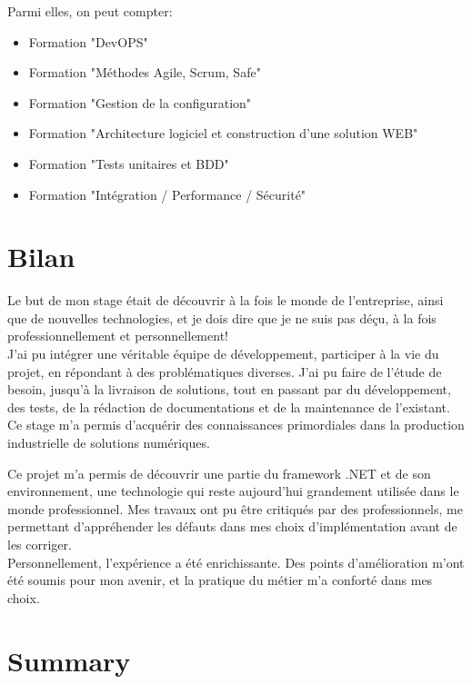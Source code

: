 \documentclass{rapport}
\begin{document}
Parmi elles, on peut compter:
\begin{itemize}
    \item Formation "DevOPS"
    \item Formation "Méthodes Agile, Scrum, Safe"
    \item Formation "Gestion de la configuration"
    \item Formation "Architecture logiciel et construction d’une solution WEB"
    \item Formation "Tests unitaires et BDD"
    \item Formation "Intégration / Performance / Sécurité"
\end{itemize}


\newpage
\section{Bilan}

Le but de mon stage était de découvrir à la fois le monde de l'entreprise, ainsi que de nouvelles technologies, et je dois dire que je ne suis pas déçu, à la fois professionnellement et personnellement!\\

J'ai pu intégrer une véritable équipe de développement, participer à la vie du projet, en répondant à des problématiques diverses. J'ai pu faire de l'étude de besoin, jusqu'à la livraison de solutions, tout en passant par du développement, des tests, de la rédaction de documentations et de la maintenance de l'existant. Ce stage m'a permis d'acquérir des connaissances primordiales dans la production industrielle de solutions numériques.

Ce projet m'a permis de découvrir une partie du framework .NET et de son environnement, une technologie qui reste aujourd'hui grandement utilisée dans le monde professionnel.
Mes travaux ont pu être critiqués par des professionnels, me permettant d'appréhender les défauts dans mes choix d'implémentation avant de les corriger. \\

Personnellement, l'expérience a été enrichissante. Des points d'amélioration m'ont été soumis pour mon avenir, et la pratique du métier m'a conforté dans mes choix.

\section*{Summary}
\end{document}
